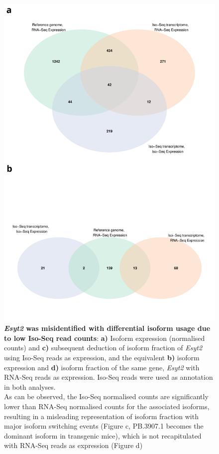 \begin{figure}[htp]
	\begin{center}
		\includegraphics[page=9,scale = 0.55]{Figures/WholeDifferentialAnalysis.pdf}
	\end{center}
	\captionsetup{width=0.95\textwidth}
	\caption[\textit{Esyt2} was misidentified with differential isoform usage due to low Iso-Seq read counts]%
	{\textbf{\textit{Esyt2} was misidentified with differential isoform usage due to low Iso-Seq read counts}: \textbf{a)} Isoform expression (normalised counts) and \textbf{c)} subsequent deduction of isoform fraction of \textit{Esyt2} using Iso-Seq reads as expression, and the equivalent \textbf{b)} isoform expression and \textbf{d)} isoform fraction of the same gene, \textit{Esyt2} with RNA-Seq reads as expression. Iso-Seq reads were used as annotation in both analyses. 
		\\
		As can be observed, the Iso-Seq normalised counts are significantly lower than RNA-Seq normalised counts for the associated isoforms, resulting in a misleading representation of isoform fraction with major isoform switching events (Figure c, PB.3907.1 becomes the dominant isoform in transgenic mice), which is not recapitulated with RNA-Seq reads as expression (Figure d)}   
	\label{fig:DIU_esyt2}
\end{figure}

